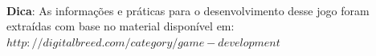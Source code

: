 \documentclass[a4paper,12pt,brazil,doubleside]{book}
\begin{document}
\begin{singlespace}
\begin{framed}
\paragraph{}\textbf{Dica}: As informações e práticas para o desenvolvimento desse jogo foram extraídas com base no material disponível em:
\textit{ \\\(http://digitalbreed.com/category/game-development\)}
\end{framed}

\end{singlespace}

\singlespace
{}
\cleardoublepage
\thispagestyle{empty}
{}


\doublespace
\end{document}
